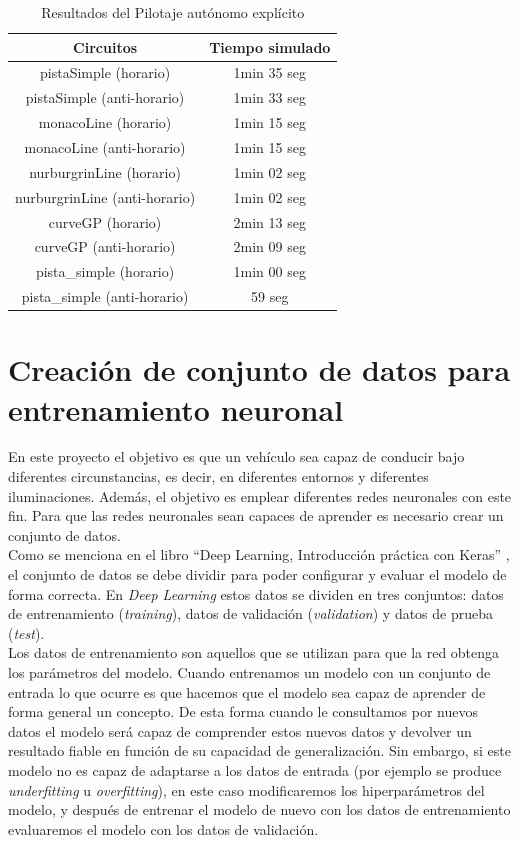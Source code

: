 \begin{table}[]
\centering
\caption{Resultados del Pilotaje autónomo explícito}
\label{tabla_piloto}
\begin{tabular}{| c| c |}
\hline
Circuitos & Tiempo simulado \\
\hline \hline
pistaSimple (horario) & 1min 35 seg \\ \hline
pistaSimple (anti-horario) & 1min 33 seg \\ \hline
monacoLine (horario) & 1min 15 seg \\ \hline
monacoLine (anti-horario) & 1min 15 seg \\ \hline
nurburgrinLine (horario) & 1min 02 seg \\ \hline
nurburgrinLine (anti-horario) & 1min 02 seg \\ \hline
curveGP (horario) & 2min 13 seg \\ \hline
curveGP (anti-horario) & 2min 09 seg \\ \hline
pista\_simple (horario) & 1min 00 seg \\ \hline
pista\_simple (anti-horario) & 59 seg \\ \hline
\end{tabular}
\end{table}


\section{Creación de conjunto de datos para entrenamiento neuronal}\label{dataset}

En este proyecto el objetivo es que un vehículo sea capaz de conducir bajo diferentes circunstancias, es decir, en diferentes entornos y diferentes iluminaciones. Además, el objetivo es emplear diferentes redes neuronales con este fin. Para que las redes neuronales sean capaces de aprender es necesario crear un conjunto de datos.\\

Como se menciona en el libro ``Deep Learning, Introducción práctica con Keras'' \cite{Jordi_torres}, el conjunto de datos se debe dividir para poder configurar y evaluar el modelo de forma correcta. En \textit{Deep Learning} estos datos se dividen en tres conjuntos: datos de entrenamiento (\textit{training}), datos de validación (\textit{validation}) y datos de prueba (\textit{test}).\\

Los datos de entrenamiento son aquellos que se utilizan para que la red obtenga los parámetros del modelo. Cuando entrenamos un modelo con un conjunto de entrada lo que ocurre es que hacemos que el modelo sea capaz de aprender de forma general un concepto. De esta forma cuando le consultamos por nuevos datos el modelo será capaz de comprender estos nuevos datos y devolver un resultado fiable en función de su capacidad de generalización. Sin embargo, si este modelo no es capaz de adaptarse a los datos de entrada (por ejemplo se produce \textit{underfitting} u \textit{overfitting}), en este caso modificaremos los hiperparámetros del modelo, y después de entrenar el modelo de nuevo con los datos de entrenamiento evaluaremos el modelo con los datos de validación.\\

